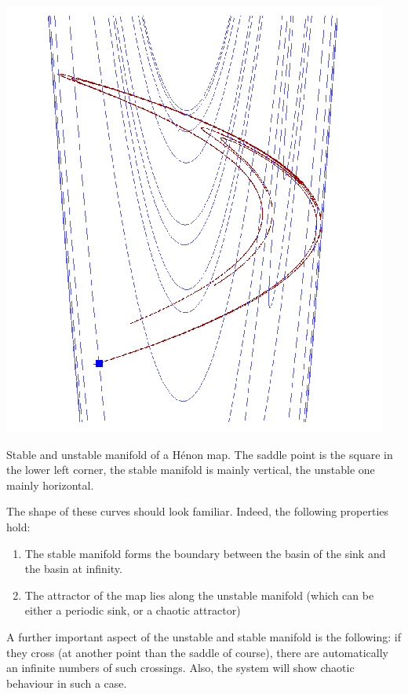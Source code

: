 \begin{marginfigure}
\centering
\includegraphics{dynamic/figures/manifold}
\caption{Stable and unstable manifold of a H\'{e}non map. The saddle point is the square in the lower left corner, the stable manifold is mainly vertical, the unstable one mainly horizontal.}
\label{fig-manifold}
\end{marginfigure} 

The shape of these curves should look familiar. Indeed, the following properties hold:

\begin{enumerate}
\item
The stable manifold forms the boundary between the basin of the sink and the basin at infinity.
\item
The attractor of the map lies along the unstable manifold (which can be either a periodic sink, or a chaotic attractor)
\end{enumerate}

A further important aspect of the unstable and stable manifold is the following: if they cross (at another point than the saddle of course), there are automatically an infinite numbers of such crossings. Also, the system will show chaotic behaviour in such a case.

